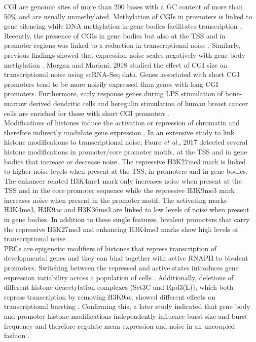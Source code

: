 \Gls{CGI} are genomic sites of more than 200 bases with a GC content of more than 50\% and are usually unmethylated. Methylation of CGIs in promoters is linked to gene silencing while DNA methylation in gene bodies facilitates transcription \citep{Portela2010}.  
Recently, the presence of CGIs in gene bodies but also at the TSS and in promoter regions was linked to a reduction in transcriptional noise \citep{Faure2017}. 
Similarly, previous findings showed that expression noise scales negatively with gene body methylation \cite{Huh2013}. 
Morgan and Marioni, 2018 studied the effect of CGI size on transcriptional noise using scRNA-Seq data. Genes associated with short CGI promoters tend to be more noisily expressed than genes with long CGI promoters. 
Furthermore, early response genes during \gls{LPS} stimulation of bone-marrow derived dendritic cells and heregulin stimulation of human breast cancer cells are enriched for those with short CGI promoters \citep{Morgan2018}. \\

Modifications of histones induce the activation or repression of chromatin and  therefore indirectly modulate gene expression \citep{Suganuma2011}. 
In an extensive study to link histone modifications to transcriptional noise, Faure \textit{et al.}, 2017 detected several histone modifications in promoter/core promoter motifs, at the TSS and in gene bodies that increase or decrease noise. 
The repressive \gls{H3K27me3} mark is linked to higher noise levels when present at the TSS, in promoters and in gene bodies. 
The enhancer related \gls{H3K4me1} mark only increases noise when present at the TSS and in the core promoter sequence while the repressive \gls{H3K9me3} mark increases noise when present in the promoter motif. 
The activating marks \gls{H3K4me3}, \gls{H3K9ac} and \gls{H3K36me3} are linked to low levels of noise when present in gene bodies. 
In addition to these single features, bivalent promoters that carry the repressive \gls{H3K27me3} and enhancing \gls{H3K4me3} marks show high levels of transcriptional noise \citep{Faure2017}.\\ 

\Glspl{PRC} are epigenetic modifiers of histones that repress transcription of developmental genes \citep{Chittock2017} and they can bind together with active \gls{RNAPII} to bivalent promoters. 
Switching between the repressed and active states introduces gene expression variability across a population of cells \cite{Kar2017}. 
Additionally, deletions of different histone deacetylation complexes (Set3C and Rpd3(L)), which both repress transcription by removing H3K9ac, showed different effects on transcriptional bursting \citep{Weinberger2012}.  
Confirming this, a later study indicated that gene body and promoter histone modifications independently influence burst size and burst frequency and therefore regulate mean expression and noise in an uncoupled fashion \cite{Wu2017}. \\

